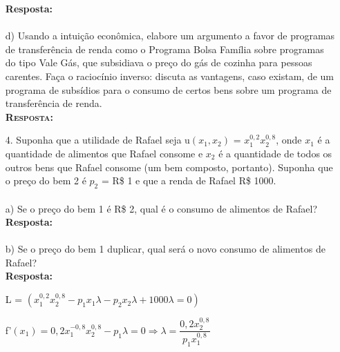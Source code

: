 \begin{enumerate}
\textbf{Resposta:}\\

\paragraph{} d) Usando a intuição econômica, elabore um argumento a favor de programas de transferência de renda como o Programa Bolsa Família sobre programas do tipo Vale Gás, que subsidiava o preço do gás de cozinha para pessoas carentes. Faça o raciocínio inverso: discuta as vantagens, caso existam, de um programa de subsídios para o consumo de certos bens sobre um programa de transferência de renda.\\

\textsc{\textbf{Resposta:}\\}

\item[4.] Suponha que a utilidade de Rafael seja u{$(x_1, x_2)$} = {$x_{1}^{0,2}x_{2}^{0,8}$}, onde {$x_1$} é a quantidade de alimentos que Rafael consome e {$x_2$} é a quantidade de todos os outros bens que Rafael consome (um bem composto, portanto). Suponha que o preço do bem 2 é {$p_2$} = R\$ 1 e que a renda de Rafael  R\$ 1000.\\

\paragraph{} a) Se o preço do bem 1 é R\$ 2, qual é o consumo de alimentos de Rafael?\\

\textbf{Resposta:}\\



\paragraph{} b) Se o preço do bem 1 duplicar, qual será o novo consumo de alimentos de Rafael?\\

\textbf{Resposta:}\\ 
\begin{center}
L = {$(x_{1}^{0,2}x_{2}^{0,8} - p_{1}x_{1}\lambda - p_{2}x_{2}\lambda + 1000\lambda = 0)$}
\end{center}

f'{$(x_{1}) = 0,2x_{1}^{-0,8}x_{2}^{0,8} - p_{1}\lambda = 0 \Longrightarrow \lambda = \dfrac{0,2x_{2}^{0,8}}{p_{1}x_{1}^{0,8}}$} \\


\end{enumerate}
